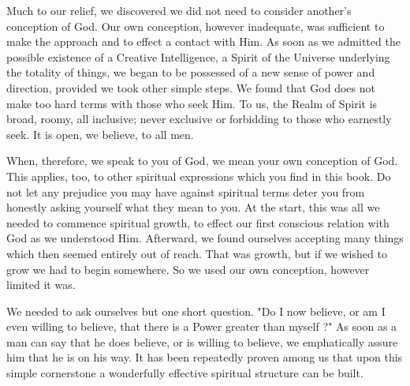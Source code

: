 \begin{biblechapter}
    Much to our relief, 
    we discovered we did not need to consider another's conception of God. 
Our own conception, however inadequate, 
    was sufficient to make the approach 
    and to effect a contact with Him. 
As soon as we admitted the possible existence of a Creative Intelligence, 
a Spirit of the Universe underlying the totality of things, 
we began to be possessed of a new sense of power and direction, 
provided we took other simple steps. 
We found that God does not make too hard terms with those who seek Him. 
To us, the Realm of Spirit is broad, roomy, all inclusive; 
never exclusive or forbidding to those who earnestly seek. 
It is open, we believe, to all men.

When, therefore, we speak to you of God, we mean your own conception of God. 
This applies, too, to other spiritual expressions which you find in this book. 
Do not let any prejudice you may have against spiritual terms 
deter you from honestly asking yourself what they mean to you. 
At the start, this was all we needed to commence spiritual growth, 
to effect our first conscious relation with God as we understood Him. 
Afterward, we found ourselves accepting many things which then seemed entirely out of reach. 
That was growth, but if we wished to grow we had to begin somewhere. 
So we used our own conception, however limited it was.

We needed to ask ourselves but one short question. 
"Do I now believe, 
or am I even willing to believe, 
that there is a Power greater than myself ?" 
As soon as a man can say that he does believe, 
or is willing to believe, 
we emphatically assure him that he is on his way. 
It has been repeatedly proven among us that upon this simple cornerstone 
a wonderfully effective spiritual structure can be built.
\end{biblechapter}


